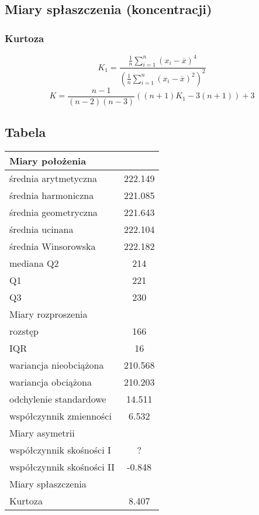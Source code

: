 \documentclass{article}
\theoremstyle{break}
\begin{document}
\subsection{Miary spłaszczenia (koncentracji)}
\subsubsection{Kurtoza}
$$K_1 =\frac{\frac{1}{n}\sum\limits_{i=1}^{n}(x_i-\overline{x})^4}{(\frac{1}{n}\sum\limits_{i=1}^{n}(x_i-\overline{x})^2)^2}$$
$$K=\frac{n-1}{(n-2)(n-3)}((n+1)K_1-3(n+1))+3$$

\subsection{Tabela}
\begin{longtable}[c]{| c | c |}
\hline
\multicolumn{2}{|l|}{\cellcolor[HTML]{DBDBDB}Miary położenia}    \\ \hline
\multicolumn{1}{|l|}{średnia arytmetyczna}          & 222.149    \\ \hline
\multicolumn{1}{|l|}{średnia harmoniczna}           & 221.085    \\ \hline
\multicolumn{1}{|l|}{średnia geometryczna}          & 221.643    \\ \hline
\multicolumn{1}{|l|}{średnia ucinana}               & 222.104    \\ \hline
\multicolumn{1}{|l|}{średnia Winsorowska}           & 222.182    \\ \hline
\multicolumn{1}{|l|}{mediana Q2}                    & 214        \\ \hline
\multicolumn{1}{|l|}{Q1}                            & 221        \\ \hline
\multicolumn{1}{|l|}{Q3}                            & 230        \\ \hline
\multicolumn{2}{|l|}{\cellcolor[HTML]{DBDBDB}Miary rozproszenia} \\ \hline
\multicolumn{1}{|l|}{rozstęp}                       & 166        \\ \hline
\multicolumn{1}{|l|}{IQR}                           & 16         \\ \hline
\multicolumn{1}{|l|}{wariancja nieobciążona}        & 210.568    \\ \hline
\multicolumn{1}{|l|}{wariancja obciążona}           & 210.203    \\ \hline
\multicolumn{1}{|l|}{odchylenie standardowe}        & 14.511     \\ \hline
\multicolumn{1}{|l|}{współczynnik zmienności}       & 6.532      \\ \hline
\multicolumn{2}{|l|}{\cellcolor[HTML]{DBDBDB}Miary asymetrii}    \\ \hline
\multicolumn{1}{|l|}{współczynnik skośności I}      & ?          \\ \hline
\multicolumn{1}{|l|}{współczynnik skośności II}     & -0.848     \\ \hline
\multicolumn{2}{|l|}{\cellcolor[HTML]{DBDBDB}Miary spłaszczenia} \\ \hline
\multicolumn{1}{|l|}{Kurtoza}                       & 8.407      \\ \hline
\end{longtable}
\end{document}
